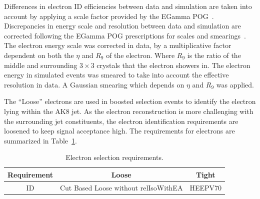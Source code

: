Differences in electron ID efficiencies between data and simulation are taken into account by applying a scale factor provided by the EGamma POG~\cite{electrons_8tev}.
Discrepancies in energy scale and resolution between data and simulation are corrected following the EGamma POG prescriptions for scales and smearings~\cite{EGMsmearings}.
The electron energy scale was corrected in data, by a multiplicative factor dependent on both the $\eta$ and $R_{9}$ of the electron. Where $R_{9}$ is the ratio of the middle and surrounding $3\times3$ \ECAL crystals that the electron showers in.
The electron energy in simulated events was smeared to take into account the effective resolution in data. A Gaussian smearing which depends on $\eta$ and $R_{9}$ was applied.

The ``Loose'' electrons are used in boosted selection events to identify the electron lying within the AK8 jet. As the electron reconstruction is more challenging with the surrounding jet constituents, the electron identification requirements are loosened to keep signal acceptance high.
The requirements for electrons are summarized in Table~\ref{tab:ElectronSelection}.
\begin{table}[htb]


  \centering

  \begin{tabular}{ccc}
\hline
Requirement                     & Loose       & Tight \\
\hline
ID                                          & Cut Based Loose without relIsoWithEA & HEEPV70  \\
\hline
  
  \end{tabular}
   \caption[Electron selection requirements]{
    Electron selection requirements.
  }
\label{tab:ElectronSelection}
\end{table}

